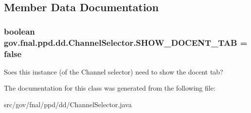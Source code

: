\subsection{Member Data Documentation}
\hypertarget{classgov_1_1fnal_1_1ppd_1_1dd_1_1ChannelSelector_ad9e88d31f70467252e90a59943338df0}{
\subsubsection[{S\-H\-O\-W\-\_\-\-D\-O\-C\-E\-N\-T\-\_\-\-T\-A\-B}]{\setlength{\rightskip}{0pt plus 5cm}boolean gov.\-fnal.\-ppd.\-dd.\-Channel\-Selector.\-S\-H\-O\-W\-\_\-\-D\-O\-C\-E\-N\-T\-\_\-\-T\-A\-B = false\hspace{0.3cm}{\ttfamily [static]}}}\label{classgov_1_1fnal_1_1ppd_1_1dd_1_1ChannelSelector_ad9e88d31f70467252e90a59943338df0}
Soes this instance (of the Channel selector) need to show the docent tab? 

The documentation for this class was generated from the following file\-:\begin{DoxyCompactItemize}
\item 
src/gov/fnal/ppd/dd/Channel\-Selector.\-java\end{DoxyCompactItemize}
